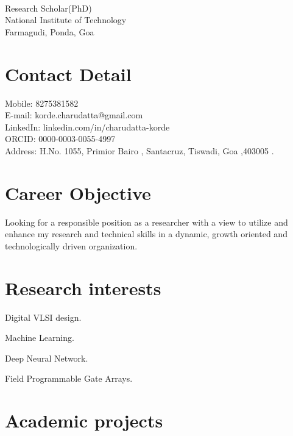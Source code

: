 \documentclass[fontsize=11pt]{tccv}
\begin{document}
\fancypage{\setlength{\fboxsep}{10pt}\fbox}{}
\\
Research Scholar(PhD)\\
National Institute of Technology\\ 
Farmagudi, Ponda, Goa\\ 
\section{Contact Detail}
\begin{flushleft} Mobile: 8275381582\\
E-mail: korde.charudatta@gmail.com\\
LinkedIn: linkedin.com/in/charudatta-korde\\
ORCID: 0000-0003-0055-4997\\
Address: H.No. 1055, Primior Bairo ,
Santacruz, Tiswadi, Goa ,403005 .
\end{flushleft}
\vspace{1em}

\section{Career Objective}
Looking for a responsible position as a researcher with a view to utilize and
enhance my research and technical skills in a dynamic, growth oriented and technologically driven organization.
\vspace{1em}

\section{Research interests}
\begin{skills}
    \item {Digital VLSI design.}
    \item {Machine Learning.}
    \item {Deep Neural Network.}
    \item {Field Programmable Gate Arrays.}
\end{skills}
\vspace{1em}

\section{Academic projects}
\end{document}
